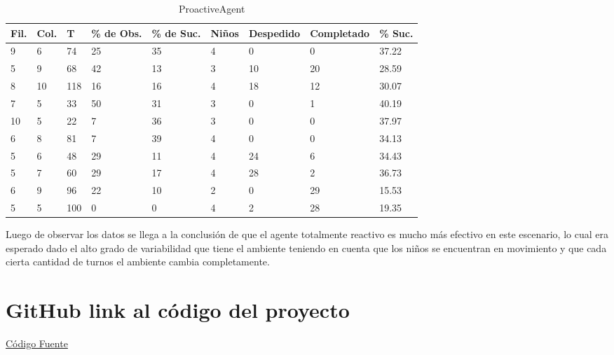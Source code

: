\documentclass[12pt]{article}
\begin{document}
\begin{table}
	\small
	\begin{center}
		\begin{tabular} {| l | l  | l | l | l | l | l | l | l |}
			\hline
			Fil. & Col.& T & \% de Obs. & \% de Suc. & Ni\~nos & Despedido & Completado & \% Suc.\\ 
			\hline
			9 & 6 & 74 & 25 & 35 & 4 & 0 & 0 & 37.22 \\
			\hline
			5 & 9 & 68 & 42 & 13 & 3 & 10 & 20 & 28.59 \\
			\hline
			8 & 10 & 118 & 16 & 16 & 4 & 18 & 12 & 30.07 \\ 
			\hline
			7 & 5 & 33 & 50 & 31 & 3 & 0 & 1 & 40.19 \\ 
			\hline 
			10 & 5 & 22 & 7 & 36 & 3 & 0 & 0 & 37.97 \\ 
			\hline
			6 & 8 & 81 & 7 & 39 & 4 & 0 & 0 & 34.13 \\ 
			\hline
			5 & 6 & 48 & 29 & 11 & 4 & 24 & 6 & 34.43 \\
			\hline
			5 & 7 & 60 & 29 & 17 & 4 & 28 & 2 & 36.73 \\ 
			\hline
			6 & 9 & 96 & 22 & 10 & 2 & 0 & 29 & 15.53 \\ 
			\hline
			5 & 5 & 100 & 0 & 0 & 4 & 2 & 28 & 19.35 \\ 
			\hline
	 	\end{tabular}
		\caption{ProactiveAgent}
	\end{center}	
\end{table}
\newline
\newline
\newline
\newline
Luego de observar los datos se llega a la conclusi\'on de que el agente totalmente reactivo es mucho m\'as efectivo en este escenario,
lo cual era esperado dado el alto grado de variabilidad que tiene el ambiente teniendo en cuenta que los ni\~nos se encuentran en movimiento y 
que cada cierta cantidad de turnos el ambiente cambia completamente.

\section{GitHub link al c\'odigo del proyecto}
\href{https://github.com/stdevMauricio1802/nany-robot.git}{C\'odigo Fuente}
\end{document}

